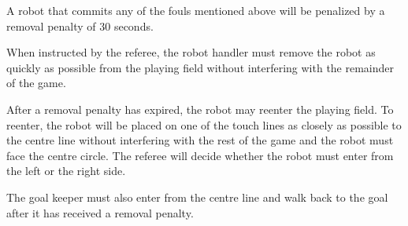 \documentclass[12pt]{hurocup}
\begin{document}
\label{law:removal penalty}

\begin{lawlist}[US]
\item A robot that commits any of the fouls mentioned above will be
  penalized by a removal penalty of 30 seconds.

\item When instructed by the referee, the robot handler must remove
  the robot as quickly as possible from the playing field without
  interfering with the remainder of the game.

\item After a removal penalty has expired, the robot may reenter the
  playing field. To reenter, the robot will be placed on one of the
  touch lines as closely as possible to the centre line without
  interfering with the rest of the game and the robot must face the
  centre circle. The referee will decide whether the robot must enter
  from the left or the right side.

\end{lawlist}

\begin{decisions}
\item The goal keeper must also enter from the centre line and walk
  back to the goal after it has received a removal penalty.
\end{decisions}

\label{law:penalty-kick}
\end{document}
